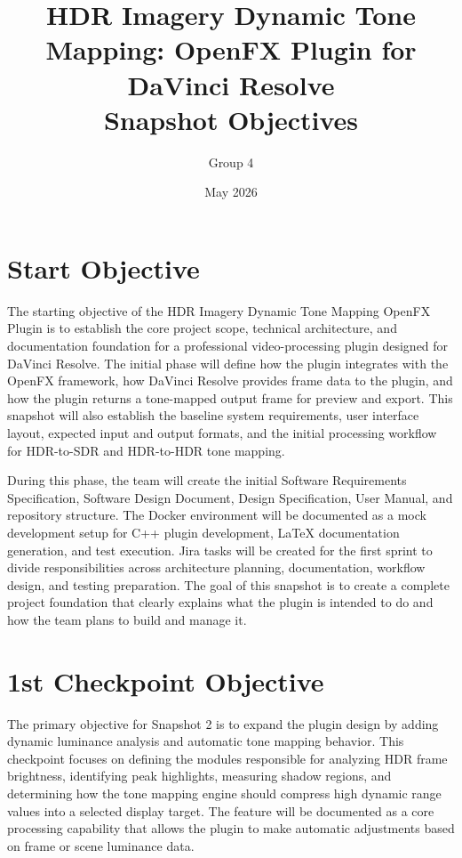 \documentclass[12pt]{article}
\title{HDR Imagery Dynamic Tone Mapping: OpenFX Plugin for DaVinci Resolve \\ Snapshot Objectives}
\author{Group 4}
\date{May 2026}
\begin{document}
\begin{titlepage}
\maketitle
\thispagestyle{empty}
\end{titlepage}


\section*{Start Objective}

The starting objective of the HDR Imagery Dynamic Tone Mapping OpenFX Plugin is to establish the core project scope, technical architecture, and documentation foundation for a professional video-processing plugin designed for DaVinci Resolve. The initial phase will define how the plugin integrates with the OpenFX framework, how DaVinci Resolve provides frame data to the plugin, and how the plugin returns a tone-mapped output frame for preview and export. This snapshot will also establish the baseline system requirements, user interface layout, expected input and output formats, and the initial processing workflow for HDR-to-SDR and HDR-to-HDR tone mapping.

During this phase, the team will create the initial Software Requirements Specification, Software Design Document, Design Specification, User Manual, and repository structure. The Docker environment will be documented as a mock development setup for C++ plugin development, LaTeX documentation generation, and test execution. Jira tasks will be created for the first sprint to divide responsibilities across architecture planning, documentation, workflow design, and testing preparation. The goal of this snapshot is to create a complete project foundation that clearly explains what the plugin is intended to do and how the team plans to build and manage it.

\section*{1st Checkpoint Objective}

The primary objective for Snapshot 2 is to expand the plugin design by adding dynamic luminance analysis and automatic tone mapping behavior. This checkpoint focuses on defining the modules responsible for analyzing HDR frame brightness, identifying peak highlights, measuring shadow regions, and determining how the tone mapping engine should compress high dynamic range values into a selected display target. The feature will be documented as a core processing capability that allows the plugin to make automatic adjustments based on frame or scene luminance data.
\end{document}
